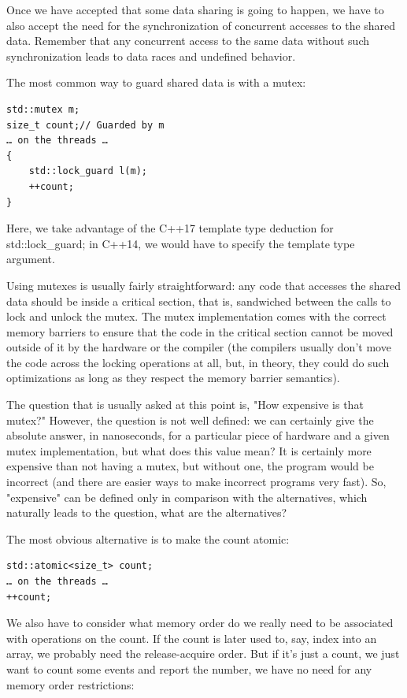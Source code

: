 
Once we have accepted that some data sharing is going to happen, we have to also accept the need for the synchronization of concurrent accesses to the shared data. Remember that any concurrent access to the same data without such synchronization leads to data races and undefined behavior.

The most common way to guard shared data is with a mutex:

\begin{lstlisting}[style=styleCXX]
std::mutex m;
size_t count;// Guarded by m
… on the threads …
{
	std::lock_guard l(m);
	++count;
}
\end{lstlisting}

Here, we take advantage of the C++17 template type deduction for std::lock\_guard; in C++14, we would have to specify the template type argument.

Using mutexes is usually fairly straightforward: any code that accesses the shared data should be inside a critical section, that is, sandwiched between the calls to lock and unlock the mutex. The mutex implementation comes with the correct memory barriers to ensure that the code in the critical section cannot be moved outside of it by the hardware or the compiler (the compilers usually don't move the code across the locking operations at all, but, in theory, they could do such optimizations as long as they respect the memory barrier semantics).

The question that is usually asked at this point is, "How expensive is that mutex?" However, the question is not well defined: we can certainly give the absolute answer, in nanoseconds, for a particular piece of hardware and a given mutex implementation, but what does this value mean? It is certainly more expensive than not having a mutex, but without one, the program would be incorrect (and there are easier ways to make incorrect programs very fast). So, "expensive" can be defined only in comparison with the alternatives, which naturally leads to the question, what are the alternatives?

The most obvious alternative is to make the count atomic:

\begin{lstlisting}[style=styleCXX]
std::atomic<size_t> count;
… on the threads …
++count;
\end{lstlisting}

We also have to consider what memory order do we really need to be associated with operations on the count. If the count is later used to, say, index into an array, we probably need the release-acquire order. But if it's just a count, we just want to count some events and report the number, we have no need for any memory order restrictions:

